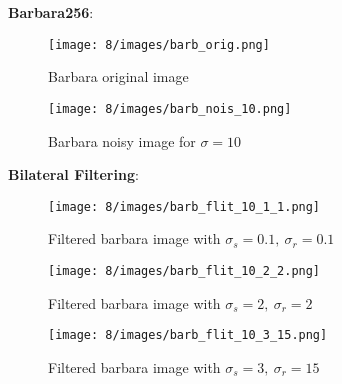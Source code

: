 \documentclass[12pt]{article}
\begin{document}
\begin{itemize}
    \textbf{Barbara256}:
    
    \begin{figure}[H]
        \centering
        \begin{minipage}{.45\textwidth}
          \centering
          \texttt{[image: 8/images/barb\_orig.png]}
          \caption*{Barbara original image}
          \label{fig:totalpowervst}
        \end{minipage}
        \begin{minipage}{.45\textwidth}
          \centering
          \texttt{[image: 8/images/barb\_nois\_10.png]}
          \caption*{Barbara noisy image for $\sigma = 10$}
          \label{fig:totalpower2}
        \end{minipage}
        \label{fig:totalPower}
    \end{figure}
    
    \textbf{Bilateral Filtering}:
    
    \begin{figure}[H]
        \centering
        \begin{minipage}{.45\textwidth}
          \centering
          \texttt{[image: 8/images/barb\_flit\_10\_1\_1.png]}
          \caption*{Filtered barbara image with $\sigma_s=0.1, \ \sigma_r=0.1$}
          \label{fig:totalpowervst}
        \end{minipage}
        \begin{minipage}{.45\textwidth}
          \centering
          \texttt{[image: 8/images/barb\_flit\_10\_2\_2.png]}
          \caption*{Filtered barbara image with $\sigma_s=2, \ \sigma_r=2$}
          \label{fig:totalpower2}
        \end{minipage}
        \label{fig:totalPower}
    \end{figure}
    
    \begin{figure}[H]
        \centering
        \begin{minipage}{.45\textwidth}
          \centering
          \texttt{[image: 8/images/barb\_flit\_10\_3\_15.png]}
          \caption*{Filtered barbara image with $\sigma_s=3, \ \sigma_r=15$}
          \label{fig:totalpowervst}
        \end{minipage}
    \end{figure}
    

\end{itemize}
\end{document}
